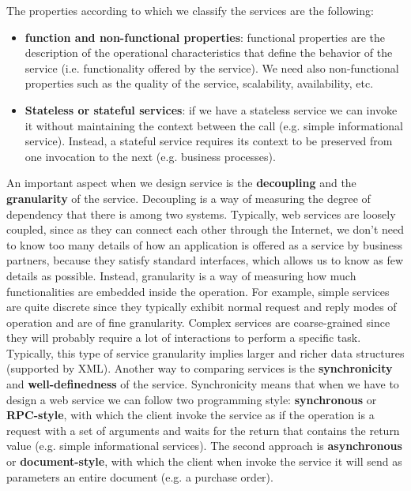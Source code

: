 The properties according to which we classify the services are the following:
\begin{itemize}
    \item \textbf{function and non-functional properties}: functional properties are the description of the operational characteristics that define the behavior of the service (i.e. functionality offered by the service). We need also non-functional properties such as the quality of the service, scalability, availability, etc.
    \item \textbf{Stateless or stateful services}: if we have a stateless service we can invoke it without maintaining the context between the call (e.g. simple informational service). Instead, a stateful service requires its context to be preserved from one invocation to the next (e.g. business processes).
\end{itemize}
An important aspect when we design service is the \textbf{decoupling} and the \textbf{granularity} of the service.
Decoupling is a way of measuring the degree of dependency that there is among two systems.
Typically, web services are loosely coupled, since as they can connect each other through the Internet, we don't need to know too many details of how an application is offered as a service by business partners, because they satisfy standard interfaces, which allows us to know as few details as possible.
Instead, granularity is a way of measuring how much functionalities are embedded inside the operation. For example, simple services are quite discrete since they typically exhibit normal request and reply modes of operation and are of fine granularity.
Complex services are coarse-grained since they will probably require a lot of interactions to perform a specific task.
Typically, this type of service granularity implies larger and richer data structures (supported by XML).
\newline\newline
Another way to comparing services is the \textbf{synchronicity} and \textbf{well-definedness} of the service.
Synchronicity means that when we have to design a web service we can follow two programming style: \textbf{synchronous} or \textbf{RPC-style}, with which the client invoke the service as if the operation is a request with a set of arguments and waits for the return that contains the return value (e.g. simple informational services).
The second approach is \textbf{asynchronous} or \textbf{document-style}, with which the client when invoke the service it will send as parameters an entire document (e.g. a purchase order).
